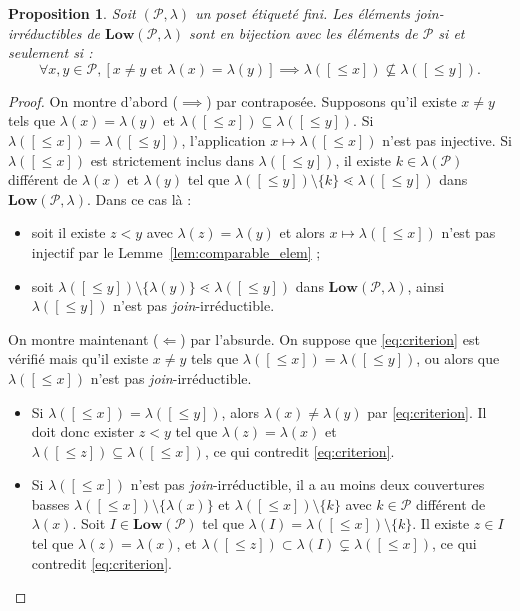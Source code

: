 \documentclass[leqno, 12pt]{amsart}
\numberwithin{equation}{section}
\newtheorem{prop}[thm]{Proposition}
\newcommand{\Pos}{\mathcal P}
\newcommand{\IdL}{\mathbf{Low}}
\begin{document}
\begin{prop}
  Soit $(\Pos,\lambda)$ un poset étiqueté fini. Les éléments \emph{join}-irréductibles de $\IdL(\Pos,\lambda)$ sont en bijection avec les éléments de $\Pos$ si et seulement si :
  \begin{equation}
  \label{eq:criterion}
    \forall x,y\in \Pos, [x\neq y\text{ et } \lambda(x)=\lambda(y)] \implies \lambda([\le x])\nsubseteq\lambda([\le y]).
  \end{equation}
\end{prop}
\begin{proof}
  On montre d'abord ($\implies $) par contraposée. Supposons qu'il existe $x\neq y$ tels que $\lambda(x)=\lambda(y)$ et $\lambda([\le x])\subseteq \lambda([\le y])$.
  Si $\lambda([\le x])=\lambda([\le y])$, l'application $x\mapsto \lambda([\le x])$ n'est pas injective.
  Si $\lambda([\le x])$ est strictement inclus dans $\lambda([\le y])$, il existe $k\in \lambda(\Pos)$ différent de $\lambda(x)$ et $\lambda(y)$ tel que $\lambda([\le y])\setminus\{k\}\lessdot \lambda([\le y])$ dans $\IdL(\Pos,\lambda)$. Dans ce cas là :
  \begin{itemize}
  \item[$\bullet$] soit il existe $z<y$ avec $\lambda(z)=\lambda(y)$ et alors $x\mapsto \lambda([\le x])$ n'est pas injectif par le Lemme~\ref{lem:comparable_elem} ;
  \item[$\bullet$] soit $\lambda([\le y])\setminus\{\lambda(y)\}\lessdot \lambda([\le y])$ dans $\IdL(\Pos,\lambda)$, ainsi $\lambda([\le y])$ n'est pas \emph{join}-irréductible.
  \end{itemize}
  
 On montre maintenant ($\Longleftarrow$) par l'absurde. On suppose que \eqref{eq:criterion} est vérifié mais qu'il existe $x\neq y$ tels que $\lambda([\le x])=\lambda([\le y])$, ou alors que $\lambda([\le x])$ n'est pas \emph{join}-irréductible. 
 \begin{itemize}
 \item[$\bullet$]   Si $\lambda([\le x])=\lambda([\le y])$, alors $\lambda(x)\neq \lambda(y)$ par \eqref{eq:criterion}. Il doit donc exister $z<y$ tel que $\lambda(z)=\lambda(x)$ et $\lambda([\le z])\subseteq\lambda([\le x])$, ce qui contredit \eqref{eq:criterion}.
 \item[$\bullet$] Si $\lambda([\le x])$ n'est pas \emph{join}-irréductible, il a au moins deux couvertures basses $\lambda([\le x])\setminus \{\lambda(x)\}$ et $\lambda([\le x])\setminus \{k\}$ avec $k\in \Pos$ différent de $\lambda(x)$. Soit $I\in \IdL(\Pos)$ tel que $\lambda(I)=\lambda([\le x])\setminus \{k\}$. Il existe $z\in I$ tel que $\lambda(z)=\lambda(x)$, et $\lambda([\le z])\subset \lambda(I) \subsetneq \lambda([\le x])$, ce qui contredit \eqref{eq:criterion}. \qedhere
 \end{itemize}
 
 \end{proof}
 
\end{document}
